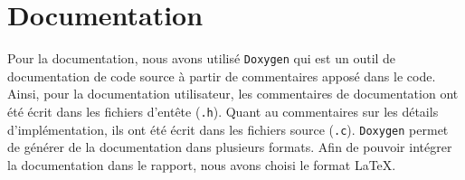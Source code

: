 \section{Documentation}

Pour la documentation, nous avons utilisé \texttt{Doxygen} qui est un outil de documentation de code source à partir de commentaires apposé dans le code.
Ainsi, pour la documentation utilisateur, les commentaires de documentation ont été écrit dans les fichiers d'entête (\texttt{.h}). 
Quant au commentaires sur les détails d'implémentation, ils ont été écrit dans les fichiers source (\texttt{.c}).
\texttt{Doxygen} permet de générer de la documentation dans plusieurs formats.
Afin de pouvoir intégrer la documentation dans le rapport, nous avons choisi le format \LaTeX.